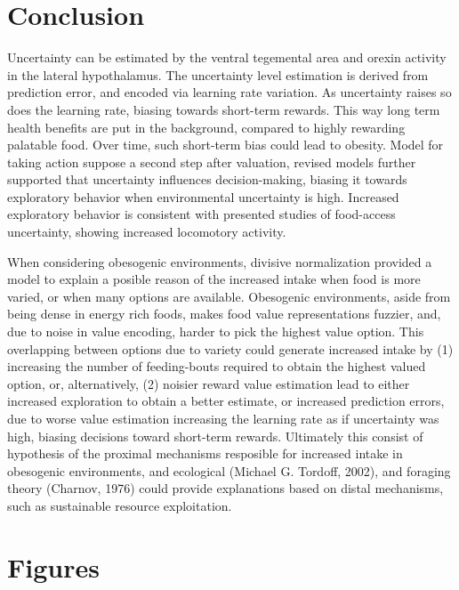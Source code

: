 \documentclass[
]{/home/nicoluarte/Downloads/templates/PNAS-template-main.tex}
\begin{document}
\hypertarget{conclusion}{%
\section{Conclusion}\label{conclusion}}

Uncertainty can be estimated by the ventral tegemental area and orexin
activity in the lateral hypothalamus. The uncertainty level estimation
is derived from prediction error, and encoded via learning rate
variation. As uncertainty raises so does the learning rate, biasing
towards short-term rewards. This way long term health benefits are put
in the background, compared to highly rewarding palatable food. Over
time, such short-term bias could lead to obesity. Model for taking
action suppose a second step after valuation, revised models further
supported that uncertainty influences decision-making, biasing it
towards exploratory behavior when environmental uncertainty is high.
Increased exploratory behavior is consistent with presented studies of
food-access uncertainty, showing increased locomotory activity.

When considering obesogenic environments, divisive normalization
provided a model to explain a posible reason of the increased intake
when food is more varied, or when many options are available. Obesogenic
environments, aside from being dense in energy rich foods, makes food
value representations fuzzier, and, due to noise in value encoding,
harder to pick the highest value option. This overlapping between
options due to variety could generate increased intake by (1) increasing
the number of feeding-bouts required to obtain the highest valued
option, or, alternatively, (2) noisier reward value estimation lead to
either increased exploration to obtain a better estimate, or increased
prediction errors, due to worse value estimation increasing the learning
rate as if uncertainty was high, biasing decisions toward short-term
rewards. Ultimately this consist of hypothesis of the proximal
mechanisms resposible for increased intake in obesogenic environments,
and ecological (Michael G. Tordoff, 2002), and foraging theory (Charnov,
1976) could provide explanations based on distal mechanisms, such as
sustainable resource exploitation.

\newpage

\hypertarget{figures}{%
\section{Figures}\label{figures}}
\end{document}
